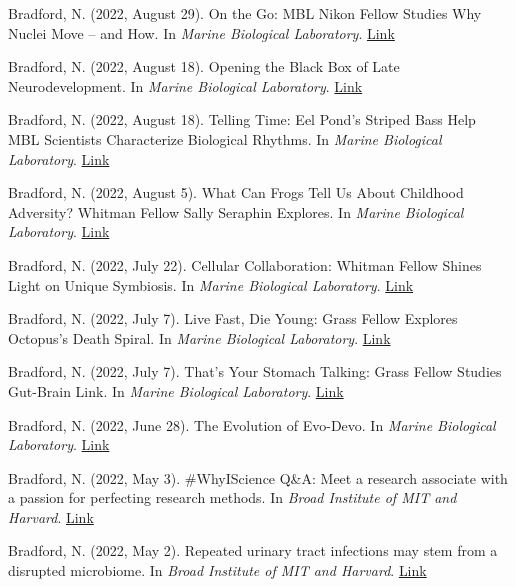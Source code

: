 \documentclass[margin, 10pt]{res} %
\begin{document}
\begin{resume}
Bradford, N. (2022, August 29). On the Go: MBL Nikon Fellow Studies Why Nuclei Move – and How. In {\sl Marine Biological Laboratory}. \href{https://www.mbl.edu/news/go-mbl-nikon-fellow-studies-why-nuclei-move-and-how}{Link}

Bradford, N. (2022, August 18). Opening the Black Box of Late Neurodevelopment. In {\sl Marine Biological Laboratory}. \href{https://www.mbl.edu/news/opening-black-box-late-neurodevelopment}{Link}

Bradford, N. (2022, August 18). Telling Time: Eel Pond’s Striped Bass Help MBL Scientists Characterize Biological Rhythms. In {\sl Marine Biological Laboratory}. \href{https://www.mbl.edu/news/telling-time-eel-ponds-striped-bass-help-mbl-scientists-characterize-biological-rhythms}{Link}

Bradford, N. (2022, August 5). What Can Frogs Tell Us About Childhood Adversity? Whitman Fellow Sally Seraphin Explores. In {\sl Marine Biological Laboratory}. \href{https://www.mbl.edu/news/what-can-frogs-tell-us-about-childhood-adversity-whitman-fellow-sally-seraphin-explores}{Link}

Bradford, N. (2022, July 22). Cellular Collaboration: Whitman Fellow Shines Light on Unique Symbiosis. In {\sl Marine Biological Laboratory}. \href{https://www.mbl.edu/news/cellular-collaboration-whitman-fellow-shines-light-unique-symbiosis}{Link}

Bradford, N. (2022, July 7). Live Fast, Die Young: Grass Fellow Explores Octopus's Death Spiral. In {\sl Marine Biological Laboratory}. \href{https://www.mbl.edu/news/live-fast-die-young-grass-fellow-explores-octopuss-death-spiral}{Link}

Bradford, N. (2022, July 7). That’s Your Stomach Talking: Grass Fellow Studies Gut-Brain Link. In {\sl Marine Biological Laboratory}. \href{https://www.mbl.edu/news/thats-your-stomach-talking-grass-fellow-studies-gut-brain-link}{Link}

Bradford, N. (2022, June 28). The Evolution of Evo-Devo. In {\sl Marine Biological Laboratory}. \href{https://www.mbl.edu/news/evolution-evo-devo}{Link}

Bradford, N. (2022, May 3). \#WhyIScience Q\&A: Meet a research associate with a passion for perfecting research methods. In {\sl Broad Institute of MIT and Harvard}. \href{https://www.broadinstitute.org/blog/whyiscience-qa-meet-research-associate-passion-perfecting-research-methods}{Link}

Bradford, N. (2022, May 2). Repeated urinary tract infections may stem from a disrupted microbiome. In {\sl Broad Institute of MIT and Harvard}. \href{https://www.broadinstitute.org/news/repeated-urinary-tract-infections-may-stem-disrupted-microbiome}{Link}



\end{resume}
\end{document}
